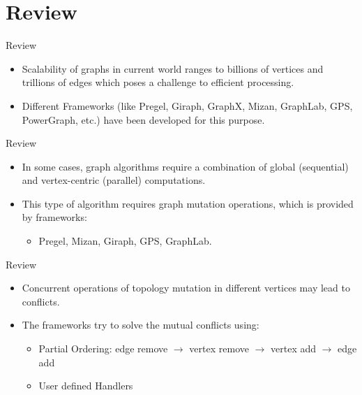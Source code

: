 \section{Review}
\begin{frame}{Review}
  \begin{itemize}
    \item Scalability of graphs in current world ranges to billions of vertices and trillions of edges which poses a challenge to efficient processing.
    \item Different Frameworks (like Pregel, Giraph, GraphX, Mizan, GraphLab, GPS, PowerGraph, etc.) have been developed for this purpose.
  \end{itemize}
  \end{frame}

  \begin{frame}{Review}
    \begin{itemize}
    \item In some cases, graph algorithms require a combination of global (sequential) and vertex-centric (parallel) computations.
    \item This type of algorithm requires graph mutation operations, which is provided by frameworks:
        \begin{itemize}
          \item Pregel, Mizan, Giraph, GPS, GraphLab.
        \end{itemize}
      \end{itemize}
    \end{frame}

    \begin{frame}{Review}
    \begin{itemize}
      \item Concurrent operations of topology mutation in different vertices may lead to conflicts.
      \item The frameworks try to solve the mutual conflicts using:
          \begin{itemize}
            \item Partial Ordering: edge remove $\rightarrow$ vertex remove $\rightarrow$ vertex add $\rightarrow$ edge add
            \item User defined Handlers
          \end{itemize}
  \end{itemize}
\end{frame}
